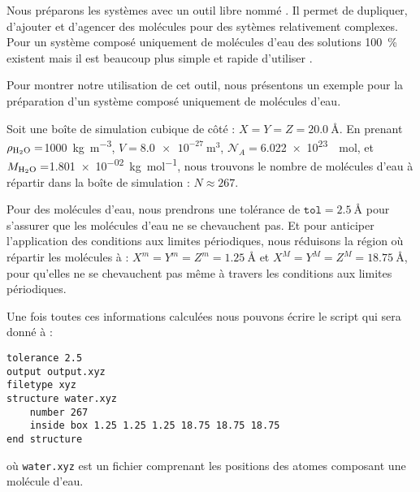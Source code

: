 
Nous préparons les systèmes avec un outil libre nommé \packmol{}. Il permet de dupliquer, d'ajouter et d'agencer des molécules pour des sytèmes relativement complexes. Pour un système composé uniquement de molécules d'eau des solutions \qty{100}{\percent} \lammps{} existent mais il est beaucoup plus simple et rapide d'utiliser \packmol{}.

Pour montrer notre utilisation de cet outil, nous présentons un exemple pour la préparation d'un système composé uniquement de molécules d'eau.

Soit une boîte de simulation cubique de côté : $X = Y = Z = \qty{20.0}{\angstrom}$. En prenant $\rho_{\ce{H2O}} = $\qty{1000}{\kilo \gram \per \cubic \meter}, $V = \qty{8.0e-27}{\cubic \meter}$, $\mathcal{N}_A = $\qty{6.022e+23}{\per \mole}, et $M_{\ce{H2O}} = $\qty{1.801e-02}{\kilo \gram \per \mole}, nous trouvons le nombre de molécules d'eau à répartir dans la boîte de simulation : $N \approx \num{267}$.

Pour des molécules d'eau, nous prendrons une tolérance de $\mathtt{tol} = \qty{2.5}{\angstrom}$ pour s'assurer que les molécules d'eau ne se chevauchent pas. Et pour anticiper l'application des conditions aux limites périodiques, nous réduisons la région où répartir les molécules à : $X^m = Y^m = Z^m = \qty{1.25}{\angstrom}$ et $X^M = Y^M = Z^M = \qty{18.75}{\angstrom}$, pour qu'elles ne se chevauchent pas même à travers les conditions aux limites périodiques.

Une fois toutes ces informations calculées nous pouvons écrire le script qui sera donné à \packmol{} :
\begin{lstlisting}[caption={Répartition des molécules d'eau}, label={lst:packmol_example}]
tolerance 2.5
output output.xyz
filetype xyz
structure water.xyz
    number 267
    inside box 1.25 1.25 1.25 18.75 18.75 18.75
end structure
\end{lstlisting}
où \lstinline!water.xyz! est un fichier comprenant les positions des atomes composant une molécule d'eau.
